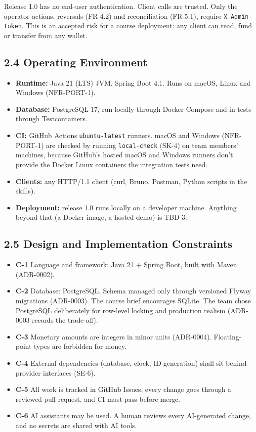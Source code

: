 \documentclass[11pt,a4paper]{article}
\providecommand{\tightlist}{\setlength{\itemsep}{2pt}\setlength{\parskip}{0pt}}
\begin{document}
Release 1.0 has no end-user authentication. Client calls are trusted. Only the operator actions,
reversals (FR-4.2) and reconciliation (FR-5.1), require \texttt{X-Admin-Token}. This is an accepted risk
for a course deployment: any client can read, fund or transfer from any wallet.

\subsection{2.4 Operating Environment}\label{operating-environment}

\begin{itemize}
\tightlist
\item
  \textbf{Runtime:} Java 21 (LTS) JVM. Spring Boot 4.1. Runs on macOS, Linux and Windows (NFR-PORT-1).
\item
  \textbf{Database:} PostgreSQL 17, run locally through Docker Compose and in tests through
  Testcontainers.
\item
  \textbf{CI:} GitHub Actions \texttt{ubuntu-latest} runners. macOS and Windows (NFR-PORT-1) are checked by
  running \texttt{local-check} (SK-4) on team members' machines, because GitHub's hosted macOS and
  Windows runners don't provide the Docker Linux containers the integration tests need.
\item
  \textbf{Clients:} any HTTP/1.1 client (curl, Bruno, Postman, Python scripts in the skills).
\item
  \textbf{Deployment:} release 1.0 runs locally on a developer machine. Anything beyond that (a Docker
  image, a hosted demo) is TBD-3.
\end{itemize}

\subsection{2.5 Design and Implementation Constraints}\label{design-and-implementation-constraints}

\begin{itemize}
\tightlist
\item
  \textbf{C-1} Language and framework: Java 21 + Spring Boot, built with Maven (ADR-0002).
\item
  \textbf{C-2} Database: PostgreSQL. Schema managed only through versioned Flyway migrations (ADR-0003).
  The course brief encourages SQLite. The team chose PostgreSQL deliberately for row-level locking
  and production realism (ADR-0003 records the trade-off).
\item
  \textbf{C-3} Monetary amounts are integers in minor units (ADR-0004). Floating-point types are
  forbidden for money.
\item
  \textbf{C-4} External dependencies (database, clock, ID generation) shall sit behind provider
  interfaces (SE-6).
\item
  \textbf{C-5} All work is tracked in GitHub Issues, every change goes through a reviewed pull request,
  and CI must pass before merge.
\item
  \textbf{C-6} AI assistants may be used. A human reviews every AI-generated change, and no secrets are
  shared with AI tools.
\end{itemize}
\end{document}
